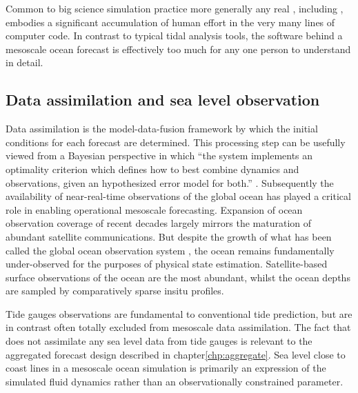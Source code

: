 Common to big science simulation practice more generally \citep{Petersen:2012tr} any real \OGCM{}, including \BL{}, embodies a significant accumulation of human effort in the very many lines of computer code.  In contrast to typical tidal analysis tools, the software behind a mesoscale ocean forecast is effectively too much for any one person to understand in detail.
\subsection{Data assimilation and sea level observation}
Data assimilation is the model-data-fusion framework by which the initial conditions for each \OGCM{} forecast are determined.
This processing step can be usefully viewed from a Bayesian perspective in which ``the system implements an optimality criterion which defines how to best combine dynamics and observations, given an hypothesized error model for both.'' \citep{10.1007/978-94-007-0332-2_13}.
Subsequently the availability of near-real-time observations of the global ocean has played a critical role in enabling operational mesoscale forecasting.  Expansion of ocean observation coverage of recent decades largely mirrors the maturation of abundant satellite communications.  But despite the growth of what has been called the global ocean observation system \GOOS{} \citep{Komen:1999ch}, the ocean remains fundamentally under-observed for the purposes of physical state estimation.   Satellite-based surface observations of the ocean are the most abundant, whilst the ocean depths are sampled by comparatively sparse insitu profiles.


Tide gauges observations are fundamental to conventional tide prediction, but are in contrast often totally excluded from mesoscale data assimilation.   The fact that \BL{} does not assimilate any sea level data from tide gauges is relevant to the aggregated forecast design described in chapter\ref{chp:aggregate}.      
Sea level close to coast lines in a mesoscale ocean simulation is primarily an expression of the simulated fluid dynamics rather than an observationally constrained parameter.

